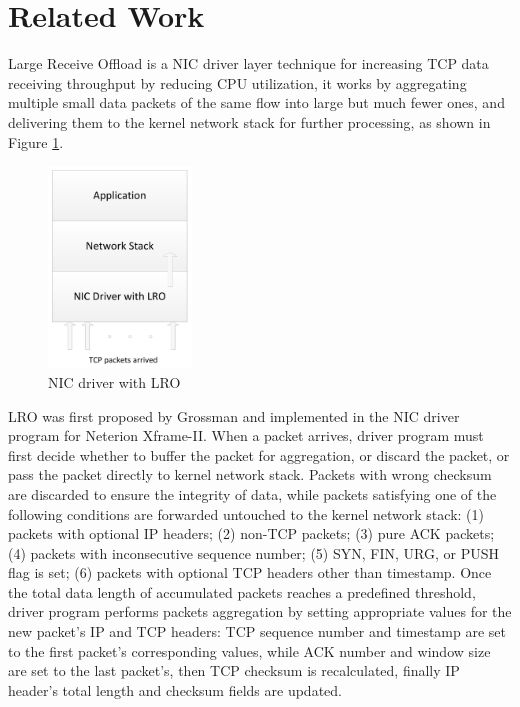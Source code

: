 \documentclass[conference]{IEEEtran}
\begin{document}
\section{Related Work}
Large Receive Offload is a NIC driver layer technique for increasing TCP data receiving throughput by reducing CPU utilization, it works by aggregating multiple small data packets of the same flow into large but much fewer ones, and delivering them to the kernel network stack for further processing, as shown in Figure \ref{driver_with_lro}.
\begin{figure}[!t]
\centering
\includegraphics[width=1.5in]{nic_driver_with_lro}
\caption{NIC driver with LRO}
\label{driver_with_lro}
\end{figure}

LRO was first proposed by Grossman\cite{grossman2005large} and implemented in the NIC driver program for Neterion Xframe-II. When a packet arrives, driver program must first decide whether to buffer the packet for aggregation, or discard the packet, or pass the packet directly to kernel network stack. Packets with wrong checksum are discarded to ensure the integrity of data, while packets satisfying one of the following conditions are forwarded untouched to the kernel network stack: (1) packets with optional IP headers; (2) non-TCP packets; (3) pure ACK packets; (4) packets with inconsecutive sequence number; (5) SYN, FIN, URG, or PUSH flag is set; (6) packets with optional TCP headers other than timestamp. Once the total data length of accumulated packets reaches a predefined threshold, driver program performs packets aggregation by setting appropriate values for the new packet's IP and TCP headers: TCP sequence number and timestamp are set to the first packet's corresponding values, while ACK number and window size are set to the last packet's, then TCP checksum is recalculated, finally IP header's total length and checksum fields are updated.
\end{document}
